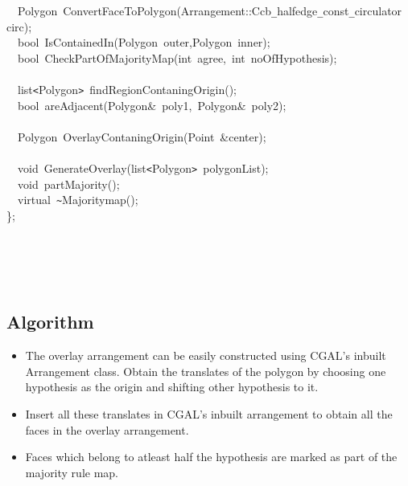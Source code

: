 \documentclass[a4paper,10pt]{article}
\begin{document}
{\jttstylea ~~\jttstylek Polygon~ConvertFaceToPolygon\jttstylei (\jttstylek Arrangement::Ccb\verb#_#halfedge\verb#_#const\verb#_#circulator~circ\jttstylei )\jttstylek ;\\
\jttstylea ~~\jttstylek bool~IsContainedIn\jttstylei (\jttstylek Polygon~outer,Polygon~inner\jttstylei )\jttstylek ;\\
\jttstylea ~~\jttstylek bool~CheckPartOfMajorityMap\jttstylei (\jttstylej int~\jttstylek agree,~\jttstylej int~\jttstylek noOfHypothesis\jttstylei )\jttstylek ;\\
\jttstylea \\
\jttstylea ~~\jttstylek list\verb#<#Polygon\verb#>#~findRegionContaningOrigin\jttstylei ()\jttstylek ;\\
\jttstylea ~~\jttstylek bool~areAdjacent\jttstylei (\jttstylek Polygon\&~poly1,~Polygon\&~poly2\jttstylei )\jttstylek ;\\
\jttstylea \\
\jttstylea ~~\jttstylek Polygon~OverlayContaningOrigin\jttstylei (\jttstylek Point~\&center\jttstylei )\jttstylek ;\\
\jttstylea \\
\jttstylea ~~\jttstylej void~\jttstylek GenerateOverlay\jttstylei (\jttstylek list\verb#<#Polygon\verb#>#~polygonList\jttstylei )\jttstylek ;\\
\jttstylea ~~\jttstylej void~\jttstylek partMajority\jttstylei ()\jttstylek ;\\
\jttstylea ~~\jttstylek virtual~\verb#~#Majoritymap\jttstylei ()\jttstylek ;\\
\jttstylei \}\jttstylek ;\\
\jttstylea \\
\jttstylea \\
\jttstylea \\
\jttstylea \jttstylea 
\\

}



\subsection{Algorithm}
\begin{itemize}
\item
The overlay arrangement can be easily constructed using CGAL's inbuilt Arrangement class. Obtain the translates of the polygon by 
choosing one hypothesis as the origin and shifting other hypothesis to it.
\item
Insert all these translates in CGAL's inbuilt arrangement to obtain all the faces in the overlay arrangement.
\item
Faces which belong to atleast half the hypothesis are marked as part of the majority rule map.
\end{itemize}
\end{document}
